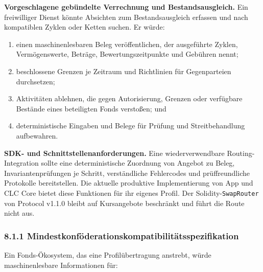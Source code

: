 \documentclass[11pt]{article}
\begin{document}
\textbf{Vorgeschlagene gebündelte Verrechnung und Bestandsausgleich.} Ein freiwilliger Dienst könnte Absichten zum Bestandsausgleich erfassen und nach kompatiblen Zyklen oder Ketten suchen. Er würde:

\begin{enumerate}[leftmargin=*]
\item einen maschinenlesbaren Beleg veröffentlichen, der ausgeführte Zyklen, Vermögenswerte, Beträge, Bewertungszeitpunkte und Gebühren nennt;
\item beschlossene Grenzen je Zeitraum und Richtlinien für Gegenparteien durchsetzen;
\item Aktivitäten ablehnen, die gegen Autorisierung, Grenzen oder verfügbare Bestände eines beteiligten Fonds verstoßen; und
\item deterministische Eingaben und Belege für Prüfung und Streitbehandlung aufbewahren.
\end{enumerate}
\textbf{SDK- und Schnittstellenanforderungen.} Eine wiederverwendbare Routing-Integration sollte eine deterministische Zuordnung von Angebot zu Beleg, Invariantenprüfungen je Schritt, verständliche Fehlercodes und prüffreundliche Protokolle bereitstellen. Die aktuelle produktive Implementierung von App und CLC Core bietet diese Funktionen für ihr eigenes Profil. Der Solidity-\texttt{SwapRouter} von Protocol v1.1.0 bleibt auf Kursangebote beschränkt und führt die Route nicht aus.

\subsubsection*{8.1.1 Mindestkonföderationskompatibilitätsspezifikation}

Ein Fonds-Ökosystem, das eine Profilübertragung anstrebt, würde maschinenlesbare Informationen für:
\end{document}

